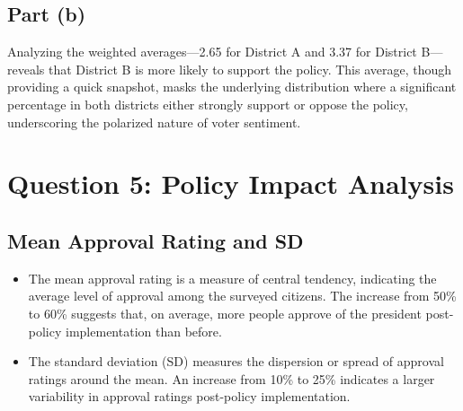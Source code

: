 \documentclass{article}
\begin{document}
\subsection*{Part (b)}
Analyzing the weighted averages—2.65 for District A and 3.37 for District B—reveals that District B is more likely to support the policy. This average, though providing a quick snapshot, masks the underlying distribution where a significant percentage in both districts either strongly support or oppose the policy, underscoring the polarized nature of voter sentiment.

\section*{Question 5: Policy Impact Analysis}

\subsection*{Mean Approval Rating and SD}
\begin{itemize}
        \item The mean approval rating is a measure of central tendency, indicating the average level of approval among the surveyed citizens. The increase from 50\% to 60\% suggests that, on average, more people approve of the president post-policy implementation than before.
        \item The standard deviation (SD) measures the dispersion or spread of approval ratings around the mean. An increase from 10\% to 25\% indicates a larger variability in approval ratings post-policy implementation.
\end{itemize}
\end{document}
